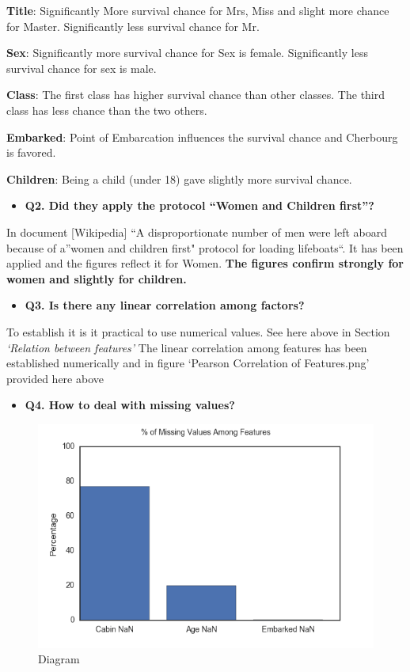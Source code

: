 \documentclass[11pt]{article}
\makeatletter
\def\maxwidth{\ifdim\Gin@nat@width>\linewidth\linewidth
    \else\Gin@nat@width\fi}
\let\Oldincludegraphics\includegraphics
\renewcommand{\includegraphics}[1]{\Oldincludegraphics[width=.8\maxwidth]{#1}}
\providecommand{\tightlist}{%
      \setlength{\itemsep}{0pt}\setlength{\parskip}{0pt}}
\makeatother
\begin{document}
\textbf{Title}: Significantly More survival chance for Mrs, Miss and
slight more chance for Master. Significantly less survival chance for
Mr.

\textbf{Sex}: Significantly more survival chance for Sex is female.
Significantly less survival chance for sex is male.

\textbf{Class}: The first class has higher survival chance than other
classes. The third class has less chance than the two others.

\textbf{Embarked}: Point of Embarcation influences the survival chance
and Cherbourg is favored.

\textbf{Children}: Being a child (under 18) gave slightly more survival
chance.

\begin{itemize}
\tightlist
\item
  \textbf{Q2. Did they apply the protocol ``Women and Children first''?}
\end{itemize}

In document {[}Wikipedia{]} ``A disproportionate number of men were left
aboard because of a''women and children first" protocol for loading
lifeboats``. It has been applied and the figures reflect it for Women.
\textbf{The figures confirm strongly for women and slightly for
children.}

\begin{itemize}
\tightlist
\item
  \textbf{Q3. Is there any linear correlation among factors?}
\end{itemize}

To establish it is it practical to use numerical values. See here above
in Section \emph{`Relation between features'} The linear correlation
among features has been established numerically and in figure `Pearson
Correlation of Features.png' provided here above

    \begin{itemize}
\tightlist
\item
  \textbf{Q4. How to deal with missing values?}
\end{itemize}

    \begin{figure}
\centering
\includegraphics{MissingDataAmongFeatures.png}
\caption{Diagram}
\end{figure}
\end{document}
